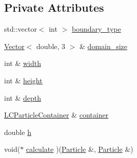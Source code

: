 \subsection*{Private Attributes}
\begin{DoxyCompactItemize}
\item 
std\-::vector$<$ int $>$ \hyperlink{classutils_1_1BoundaryHandler_a8b4bd74821356f9607a38bb5496ac0d7}{boundary\-\_\-type}
\item 
\hyperlink{classutils_1_1Vector}{Vector}$<$ double, 3 $>$ \& \hyperlink{classutils_1_1BoundaryHandler_aa8e0deffc1f066d33470a90ff04ec451}{domain\-\_\-size}
\item 
int \& \hyperlink{classutils_1_1BoundaryHandler_ad3fceed36277f905d4bc159614831f2a}{width}
\item 
int \& \hyperlink{classutils_1_1BoundaryHandler_a84cbe858f08cb4bafd4af86af5610567}{height}
\item 
int \& \hyperlink{classutils_1_1BoundaryHandler_a0d89c9f37fd21c12dea330cdd52ea79b}{depth}
\item 
\hyperlink{classutils_1_1LCParticleContainer}{L\-C\-Particle\-Container} \& \hyperlink{classutils_1_1BoundaryHandler_a6c7c960f3bc85563c81e420b295e983a}{container}
\item 
double \hyperlink{classutils_1_1BoundaryHandler_a14bda6e1d4f8514626a170cd105f8e61}{h}
\item 
void($\ast$ \hyperlink{classutils_1_1BoundaryHandler_ade349a546fc40f1eb2cc3753ac3536b9}{calculate} )(\hyperlink{classParticle}{Particle} \&, \hyperlink{classParticle}{Particle} \&)
\end{DoxyCompactItemize}



